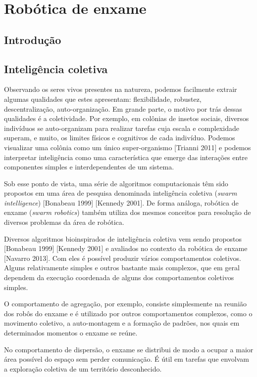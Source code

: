 \chapter{Robótica de enxame}
\label{swarm}

\section{Introdução}

\section{Inteligência coletiva}

Observando os seres vivos presentes na natureza, podemos facilmente extrair algumas qualidades que estes apresentam: flexibilidade, robustez, descentralização, auto-organização. Em grande parte, o motivo por trás dessas qualidades é a coletividade. Por exemplo, em colônias de insetos sociais, diversos indivíduos se auto-organizam para realizar tarefas cuja  escala e complexidade superam, e muito, os limites físicos e cognitivos de cada indivíduo. Podemos visualizar uma colônia como um único super-organismo [Trianni 2011] e podemos interpretar inteligência como uma característica que emerge das interações entre componentes simples e interdependentes de um sistema.

Sob esse ponto de vista, uma série de algoritmos computacionais têm sido propostos em
uma área de pesquisa denominada inteligência coletiva (\textit{swarm intelligence}) [Bonabeau 1999]
[Kennedy 2001]. De forma análoga, robótica de enxame (\textit{swarm robotics}) também utiliza dos mesmos conceitos para resolução de diversos problemas da área de robótica.

Diversos algoritmos bioinspirados de inteligência coletiva vem sendo propostos [Bonabeau 1999] [Kennedy 2001] e avaliados no contexto da robótica de enxame [Navarro 2013]. Com eles é possível produzir vários comportamentos coletivos. Alguns relativamente simples e outros bastante mais complexos, que em geral dependem da execução coordenada de alguns dos comportamentos coletivos simples.

O comportamento de agregação, por exemplo, consiste simplesmente na reunião dos
robôs do enxame e é utilizado por outros comportamentos complexos, como o movimento
coletivo, a auto-montagem e a formação de padrões, nos quais em determinados momentos o
enxame se reúne.

No comportamento de dispersão, o enxame se distribui de modo a ocupar a maior área
possível do espaço sem perder comunicação. É útil em tarefas que envolvam a exploração
coletiva de um território desconhecido.

